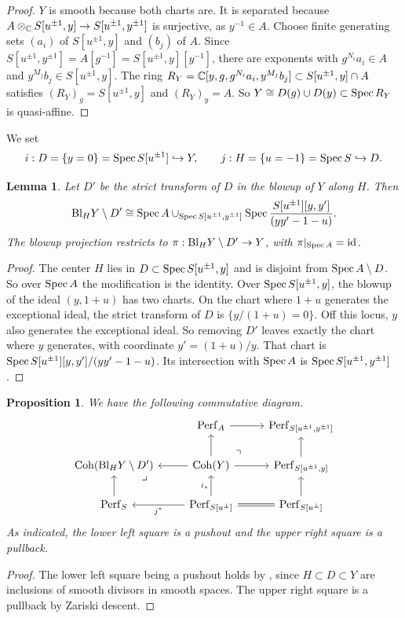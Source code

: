 \documentclass[12pt, letter]{amsart}
\newtheorem{lemma}[dummy]{Lemma}
\newtheorem{proposition}[dummy]{Proposition}
\theoremstyle{definition}
\begin{document}
\begin{proof}
$Y$ is smooth because both charts are.
It is separated because $A\otimes_{\mathbb{C}}S[u^{\pm1}, y]\to S[u^{\pm1}, y^{\pm 1}]$ is surjective, as $y^{-1}\in A$.
Choose finite generating sets $(a_i)$ of $S[u^{\pm1}, y]$ and $(b_j)$ of $A$.
Since $S[u^{\pm1}, y^{\pm 1}]=A[g^{-1}]=S[u^{\pm1}, y][y^{-1}]$, there are exponents with $g^{N_i}a_i\in A$ and $y^{M_j}b_j\in S[u^{\pm1}, y]$.
The ring $R_Y=\mathbb{C}[y,g,g^{N_i}a_i,y^{M_j}b_j]\subset S[u^{\pm1}, y] \cap A$ satisfies $(R_Y)_g=S[u^{\pm1}, y]$ and $(R_Y)_y=A$.
So $Y\cong D(g)\cup D(y)\subset\operatorname{Spec} R_Y$ is quasi-affine.
\end{proof}

We set
\[
 i:D=\{y=0\}=\operatorname{Spec} S[u^{\pm1}]\hookrightarrow Y,\qquad
 j:H=\{u=-1\}=\operatorname{Spec} S\hookrightarrow D .
\]


\begin{lemma}
\label{lem:blowup}
Let $D'$ be the strict transform of $D$ in the blowup of $Y$ along $H$.
Then
\[
 \mathrm{Bl}_HY\setminus D'
 \cong\operatorname{Spec} A\cup_{\operatorname{Spec} S[u^{\pm 1}, y^{\pm 1}]}\operatorname{Spec}\frac{S[u^{\pm1}][y,y']}{(yy'-1-u)} .
\]
The blowup projection restricts to $\pi:\mathrm{Bl}_HY\setminus D'\to Y$, with $\pi|_{\operatorname{Spec} A}=\mathrm{id}$.
\end{lemma}
\begin{proof}
The center $H$ lies in $D\subset \operatorname{Spec} S[u^{\pm1}, y]$ and is disjoint from $\operatorname{Spec} A\setminus D$.
So over $\operatorname{Spec} A$ the modification is the identity.
Over $\operatorname{Spec} S[u^{\pm1}, y]$, the blowup of the ideal $(y,1+u)$ has two charts.
On the chart where $1+u$ generates the exceptional ideal, the strict transform of $D$ is $\{y/(1+u)=0\}$.
Off this locus, $y$ also generates the exceptional ideal.
So removing $D'$ leaves exactly the chart where $y$ generates, with coordinate $y'=(1+u)/y$.
That chart is $\operatorname{Spec} S[u^{\pm1}][y,y']/(yy'-1-u)$.
Its intersection with $\operatorname{Spec} A$ is 
$\operatorname{Spec} S[u^{\pm1},y^{\pm1}]$.
\end{proof}


\begin{proposition} 
\label{prop: general B-model diagram}
We have the following commutative diagram.
    \[
\begin{tikzcd}
& \Perf_A \arrow[r] & \Perf_{S[u^{\pm1},y^{\pm1}]}  \\
\Coh(\Bl_H Y \setminus D')  \arrow[dr, phantom, "\lrcorner", very near start] & \Coh(Y) \arrow[ur, phantom, "\urcorner", very near start] \arrow[l] \arrow[r] \arrow[u] & \Perf_{S[u^{\pm1}, y]} \arrow[u] \\
\Perf_S \arrow[u] & \Perf_{S[u^\pm]} \arrow[r, equal]  \arrow[l, "j^*"] \arrow[u, "i_*"] &  \Perf_{S[u^\pm]} \arrow[u]
\end{tikzcd}
\]
As indicated, the lower left square is a pushout and the upper right square is a pullback. 
\end{proposition}
\begin{proof}
    The lower left square being a pushout holds by \cite[Theorem~4.13]{GLe}, since $H\subset D \subset Y$ are inclusions of smooth divisors in smooth spaces.  The upper right square is a pullback by Zariski descent. 
\end{proof}
\end{document}
